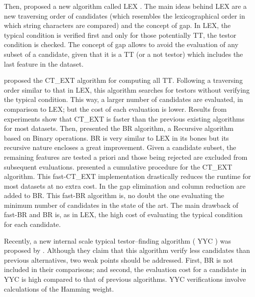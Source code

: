\documentclass[authoryear,11pt]{elsarticle}
\makeatletter
\newcommand{\setword}[2]{%
  \phantomsection
  #1\def\@currentlabel{\unexpanded{#1}}\label{#2}%
}
\makeatother
\begin{document}
  Then, \cite{Santiesteban03} proposed a new algorithm called \setword{LEX}{LEX}. The main ideas 
  behind LEX are a new traversing order of candidates (which resembles the
  lexicographical order in which string characters are compared) and the concept of gap. In LEX,
  the typical condition is verified first and only for those potentially TT, the testor 
  condition is checked. %
  The concept of gap allows to avoid the evaluation of any subset of a candidate, given that it is
  a TT (or a not testor) which includes the last feature in the dataset.
	
  \cite{Sanchez07} proposed the \setword{CT\_EXT}{CTEXT} algorithm for computing all
  TT. Following a traversing order similar to that in LEX, this algorithm searches for
  testors without verifying the typical condition. This way, a larger number of candidates are 
  evaluated, in comparison to LEX; but the cost of each evaluation is lower. Results from experiments
  show that CT\_EXT is faster than the previous existing algorithms for most datasets. Then, \cite{Lias09}
  presented the \setword{BR}{BR} algorithm, a Recursive algorithm based on 
  Binary operations. BR is very similar to LEX in its bones but its recursive nature encloses a great
  improvement. Given a candidate subset, the remaining features are tested a priori and those being 
  rejected are excluded from subsequent evaluations. \cite{Sanchez10} presented a cumulative
  procedure for the CT\_EXT algorithm. This fast-CT\_EXT implementation drastically reduces the runtime
  for most datasets at no extra cost. In \citep{Lias13} the
  gap elimination and column reduction are added to BR. This fast-BR algorithm is, no doubt the one 
  evaluating the minimum number of candidates in the state of the art. The main drawback of fast-BR and 
  BR is, as in LEX, the high cost of evaluating the typical condition for each candidate. 
 
  Recently, a new internal scale typical testor--finding algorithm (\setword{YYC}{YYC}) was proposed by \cite{Alba14}. 
  Although they claim that this algorithm verify less candidates than previous alternatives, two weak points should
  be addressed. First, BR is not included in their comparisons; and second, the evaluation cost for a candidate
  in YYC is high compared to that of previous algorithms. YYC verifications involve calculations of the 
  Hamming weight.
\end{document}
